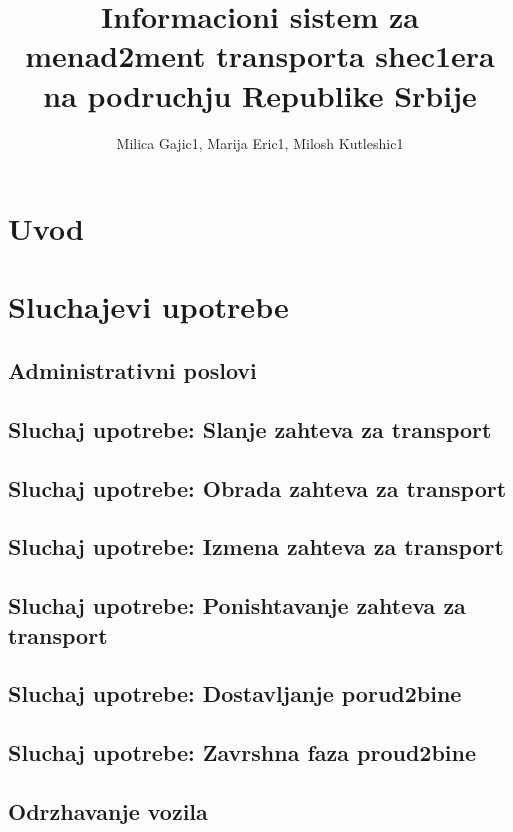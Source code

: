 \documentclass{article}
\title{Informacioni sistem za menad2ment transporta shec1era na podruchju Republike Srbije}
\author{Milica Gajic1, Marija Eric1, Milosh Kutleshic1}
\begin{document}
\maketitle
\newpage


\renewcommand*\contentsname{Sadrz1aj}
\tableofcontents
\newpage

\section{Uvod}

\section{Sluchajevi upotrebe}
\subsection{Administrativni poslovi}



\subsection{Sluchaj upotrebe: Slanje zahteva za transport}


\subsection{Sluchaj upotrebe: Obrada zahteva za transport}


\subsection{Sluchaj upotrebe: Izmena zahteva za transport}


\subsection{Sluchaj upotrebe: Ponishtavanje zahteva za transport}


\subsection{Sluchaj upotrebe: Dostavljanje porud2bine}

\subsection{Sluchaj upotrebe: Zavrshna faza proud2bine}


\subsection{Odrzhavanje vozila}




\nocite{*}
\selectfont



\end{document}

